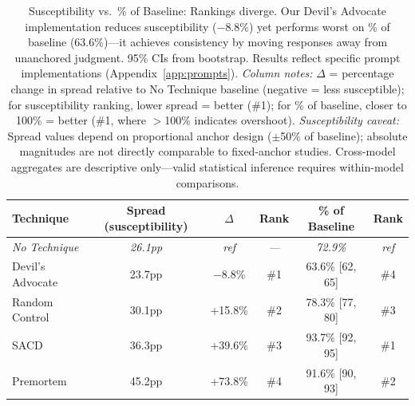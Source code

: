 \documentclass[11pt]{article}
\begin{document}
\begin{table}[H]
\centering
\caption{Susceptibility vs.\ \% of Baseline: Rankings diverge. Our Devil's Advocate implementation reduces susceptibility ($-$8.8\%) yet performs worst on \% of baseline (63.6\%)---it achieves consistency by moving responses away from unanchored judgment. 95\% CIs from bootstrap. Results reflect specific prompt implementations (Appendix~\ref{app:prompts}). \textit{Column notes:} $\Delta$ = percentage change in spread relative to No Technique baseline (negative = less susceptible); for susceptibility ranking, lower spread = better (\#1); for \% of baseline, closer to 100\% = better (\#1, where $>$100\% indicates overshoot). \textit{Susceptibility caveat:} Spread values depend on proportional anchor design ($\pm$50\% of baseline); absolute magnitudes are not directly comparable to fixed-anchor studies. Cross-model aggregates are descriptive only---valid statistical inference requires within-model comparisons.}
\label{tab:metric-comparison}
\begin{tabular}{lccccc}
\toprule
Technique & Spread (susceptibility) & $\Delta$ & Rank & \% of Baseline & Rank \\
\midrule
\textit{No Technique} & \textit{26.1pp} & \textit{ref} & \textit{---} & \textit{72.9\%} & \textit{ref} \\
\midrule
Devil's Advocate & 23.7pp & $-$8.8\% & \#1 & 63.6\% [62, 65] & \#4 \\
Random Control & 30.1pp & +15.8\% & \#2 & 78.3\% [77, 80] & \#3 \\
SACD & 36.3pp & +39.6\% & \#3 & 93.7\% [92, 95] & \#1 \\
Premortem & 45.2pp & +73.8\% & \#4 & 91.6\% [90, 93] & \#2 \\
\bottomrule
\end{tabular}
\end{table}
\end{document}
